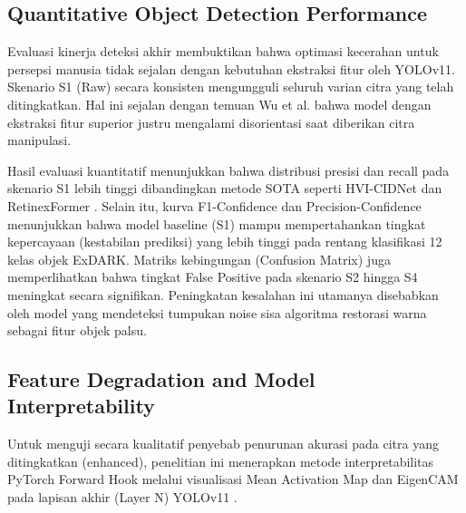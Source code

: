 ﻿\documentclass[conference]{IEEEtran}
\begin{document}

\subsection{Quantitative Object Detection Performance} Evaluasi kinerja deteksi akhir membuktikan bahwa optimasi kecerahan untuk persepsi manusia tidak sejalan dengan kebutuhan ekstraksi fitur oleh YOLOv11. Skenario S1 (Raw) secara konsisten mengungguli seluruh varian citra yang telah ditingkatkan. Hal ini sejalan dengan temuan Wu et al. \cite{wu2024llieeffect} bahwa model dengan ekstraksi fitur superior justru mengalami disorientasi saat diberikan citra manipulasi.

Hasil evaluasi kuantitatif menunjukkan bahwa distribusi presisi dan recall pada skenario S1 lebih tinggi dibandingkan metode SOTA seperti HVI-CIDNet \cite{yan2025hvi} dan RetinexFormer \cite{cai2023retinexformer}. Selain itu, kurva F1-Confidence dan Precision-Confidence menunjukkan bahwa model baseline (S1) mampu mempertahankan tingkat kepercayaan (kestabilan prediksi) yang lebih tinggi pada rentang klasifikasi 12 kelas objek ExDARK. Matriks kebingungan (Confusion Matrix) juga memperlihatkan bahwa tingkat False Positive pada skenario S2 hingga S4 meningkat secara signifikan. Peningkatan kesalahan ini utamanya disebabkan oleh model yang mendeteksi tumpukan noise sisa algoritma restorasi warna sebagai fitur objek palsu.


\subsection{Feature Degradation and Model Interpretability} Untuk menguji secara kualitatif penyebab penurunan akurasi pada citra yang ditingkatkan (enhanced), penelitian ini menerapkan metode interpretabilitas PyTorch Forward Hook melalui visualisasi Mean Activation Map dan EigenCAM pada lapisan akhir (Layer N) YOLOv11 \cite{metrics2026formulas}.
\end{document}
